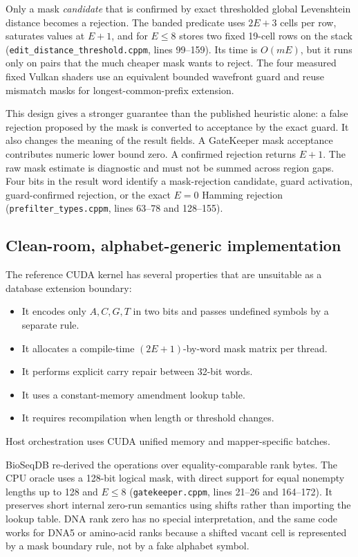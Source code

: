 Only a mask \emph{candidate} that is confirmed by exact thresholded global
Levenshtein distance becomes a rejection.  The banded predicate uses
\(2E+3\) cells per row, saturates values at \(E+1\), and for \(E\le8\) stores
two fixed 19-cell rows on the stack
(\texttt{edit\_distance\_threshold.cppm}, lines 99--159).  Its time is
\(O(mE)\), but it runs only on pairs that the much cheaper mask wants to
reject.  The four measured fixed Vulkan shaders use an equivalent bounded
wavefront guard and reuse mismatch masks for longest-common-prefix extension.

This design gives a stronger guarantee than the published heuristic alone:
a false rejection proposed by the mask is converted to acceptance by the
exact guard.  It also
changes the meaning of the result fields.  A GateKeeper mask acceptance
contributes numeric lower bound zero.  A confirmed rejection returns \(E+1\).
The raw mask estimate is diagnostic and must not be summed across region gaps.
Four bits in the result word identify a mask-rejection candidate, guard
activation, guard-confirmed rejection, or the exact \(E=0\) Hamming rejection
(\texttt{prefilter\_types.cppm}, lines 63--78 and 128--155).

\subsection{Clean-room, alphabet-generic implementation}

The reference CUDA kernel has several properties that are unsuitable as a
database extension boundary:

\begin{itemize}
    \item It encodes only \(A,C,G,T\) in two bits and passes undefined symbols
    by a separate rule.
    \item It allocates a compile-time \((2E+1)\)-by-word mask matrix per thread.
    \item It performs explicit carry repair between 32-bit words.
    \item It uses a constant-memory amendment lookup table.
    \item It requires recompilation when length or threshold changes.
\end{itemize}

Host orchestration uses CUDA unified memory and mapper-specific batches.

BioSeqDB re-derived the operations over equality-comparable rank bytes.  The
CPU oracle uses a 128-bit logical mask, with direct support for equal nonempty
lengths up to 128 and \(E\le8\)
(\texttt{gatekeeper.cppm}, lines 21--26 and 164--172).  It preserves short
internal zero-run semantics using shifts rather than importing the lookup
table.  DNA rank zero has no special interpretation, and the same code works
for DNA5 or amino-acid ranks because a shifted vacant cell is represented by a
mask boundary rule, not by a fake alphabet symbol.

